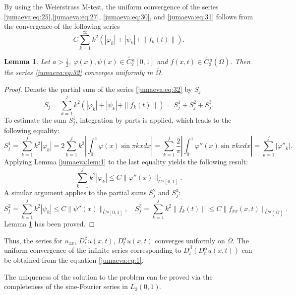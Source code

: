 \documentclass{amsart}
\numberwithin{equation}{section}
\newtheorem{lem}[thm]{Lemma}
\begin{document}
 By using the Weierstrass M-test, the uniform convergence of the series \eqref{jumaeva:eq:25},\eqref{jumaeva:eq:27}, \eqref{jumaeva:eq:30}, and \eqref{jumaeva:eq:31} follows from the convergence of the following series
 \begin{equation}
     C\sum_{k=1}^\infty k^2 (|\varphi_k|+|\psi_k|+\|f_k(t)\|).\label{jumaeva:eq:32}
 \end{equation}
 \begin{lem}
     Let $a>\frac12$, $\varphi(x),\psi(x)\in {\overset{\circ}{C}{}^{\,a}_2[0,1]}$ and $f(x,t)\in{\overset{\circ}{C}{}^{\,a}_2(\bar{\Omega})}$. Then the series \eqref{jumaeva:eq:32}  converges uniformly in $\bar{\Omega}$.\label{jumaeva:lem:7}
 \end{lem}
 \begin{proof}
Denote the partial sum of the series \eqref{jumaeva:eq:32} by $S_j$
\begin{equation*}
S_j=\sum_{k=1}^jk^2(|\varphi_k|+|\psi_k|+\|f_k(t)\|)=S_j^1+S_j^2+S_j^3.
\end{equation*}
To estimate the sum $S_j^1$, integration by parts is applied, which leads to the following equality:
\begin{equation*}
S_j^1=\sum_{k=1}^jk^2|\varphi_k|=2\sum_{k=1}^j k^2\left|\int_0^1 \varphi(x) \sin{\pi k x} dx \right|=\sum_{k=1}^j\frac{2}{\pi}\left|\int_0^1 \varphi''(x)\sin{\pi k x}dx\right|=\sum_{k=1}^j |\varphi''_k|.
\end{equation*}
Applying Lemma \ref{jumaeva:lem:1} to the last equality yields the following result:
\begin{equation*}
\sum_{k=1}^j k^2 |\varphi_k|\leq C\|\varphi''(x)\|_{{\overset{\circ}{C}{}^{\,a}[0,1]}}.
\end{equation*}
A similar argument applies to the partial sums $S_j^2$ and $S_j^3$:
\begin{equation*}
S_j^2=\sum_{k=1}^j k^2 |\psi_k|\leq C \|\psi''(x)\|_{{\overset{\circ}{C}{}^{\,a}[0,1]}},
     \quad
S_j^3=\sum_{k=1}^j k^2\|f_k(t)\|\leq C\|f_{xx}(x,t)\|_{{\overset{\circ}{C}{}^{\,a}(\bar{\Omega})}}.
\end{equation*}
Lemma \ref{jumaeva:lem:7} has been proved.
\end{proof}
Thus, the series for $u_{xx}$, $D_t^\beta u(x,t)$,  $D_t^\alpha u(x,t)$ converges uniformly on $\bar{\Omega}$.
The uniform convergence of the infinite series corresponding to $D_t^\beta(D_t^\alpha u(x,t))$ can be obtained from the equation \eqref{jumaeva:eq:1}.

The uniqueness of the solution to the problem can be proved via the completeness of the sine-Fourier series in $L_2(0,1)$.
\end{document}

